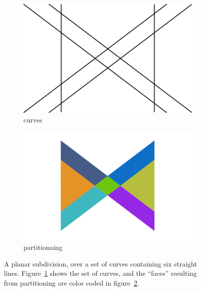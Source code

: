 \begin{figure}[!ht]
  \centering
  \begin{subfigure}{.4\textwidth}
    \includegraphics[width=\textwidth]{figures/intro_curves1.png}
    \caption{curves} \label{subfig:intro_curves1}
  \end{subfigure}%
  \quad \quad \quad%
  \begin{subfigure}{.4\textwidth}
    \includegraphics[width=\textwidth]{figures/intro_partitioning1.png}
    \caption{partitionaing} \label{subfig:intro_partitioning1}
  \end{subfigure}%
  \caption[xxx]
          {A planar subdivision, over a set of curves containing six straight lines.
          Figure~\ref{subfig:intro_curves1} shows the set of curves, and the ``faces'' resulting from partitioning are color coded in figure~\ref{subfig:intro_partitioning1}.}
  \label{fig:intro_curvesPartitioning1}
\end{figure}

